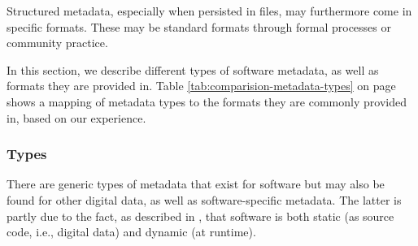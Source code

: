 \documentclass[11pt,a4paper]{scrartcl}
\begin{document}
Structured metadata, especially when persisted in files, may furthermore come in specific formats. These may be standard formats through formal processes or community practice.

In this section, we describe different types of software metadata, as well as formats they are provided in. Table \ref{tab:comparision-metadata-types} on page \pageref{tab:comparision-metadata-types} shows a mapping of metadata types to the formats they are commonly provided in, based on our experience.




\subsubsection{Types}\label{subsubsec:metadata-types}
There are generic types of metadata that exist for software but may also be found for other digital data, as well as software-specific metadata.
The latter is partly due to the fact, as described in \cite{PeerJSoftVsDataCitation}, that software is both static (as source code, i.e., digital data)
and dynamic (at runtime).

\end{document}
